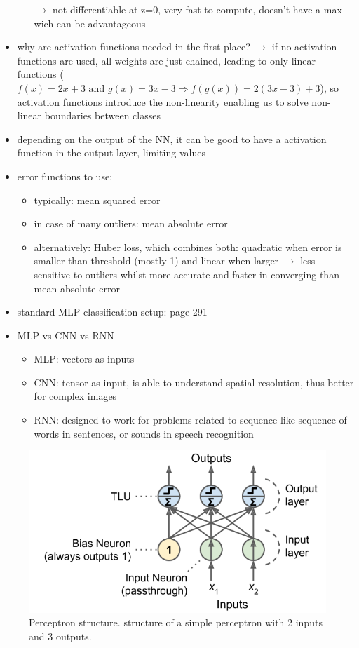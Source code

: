 \documentclass[12pt,a4paper]{article}
\begin{document}
\begin{itemize}
\begin{itemize}
    \newline \indent $\longrightarrow$ not differentiable at z=0, very fast to compute, doesn't have a max wich can be advantageous
  \end{itemize}
  \item why are activation functions needed in the first place?
  \newline \indent $\longrightarrow$ if no activation functions are used, all weights are just chained, leading to only linear functions ($f(x) = 2x+3 \text{ and } g(x) = 3x -3 \Longrightarrow f(g(x)) = 2(3x-3) + 3 $), so activation functions introduce the non-linearity enabling us to solve non-linear boundaries between classes
  \item depending on the output of the NN, it can be good to have a activation function in the output layer, limiting values
  \item error functions to use:
  \begin{itemize}
    \item typically: mean squared error
    \item in case of many outliers: mean absolute error
    \item alternatively: Huber loss, which combines both: quadratic when error is smaller than threshold (mostly 1) and linear when larger
    \newline \indent $\longrightarrow$ less sensitive to outliers whilst more accurate and faster in converging than mean absolute error
  \end{itemize}
  \item standard MLP classification setup: \cite{geron_hands-machine_2019} page 291
  \item MLP vs CNN vs RNN
  \begin{itemize}
    \item MLP: vectors as inputs
    \item CNN: tensor as input, is able to understand spatial resolution, thus better for complex images
    \item RNN: designed to work for problems related to sequence like sequence of words in sentences, or sounds in speech recognition
  \end{itemize}
\end{itemize}

\begin{figure}
  \centering
  \includegraphics[width=.5\linewidth]{Images/perceptron.png}
  \caption[Perceptron structure]{Perceptron structure. structure of a simple perceptron with 2 inputs and 3 outputs.}
  \label{fig:perceptron}
\end{figure}
\end{document}
